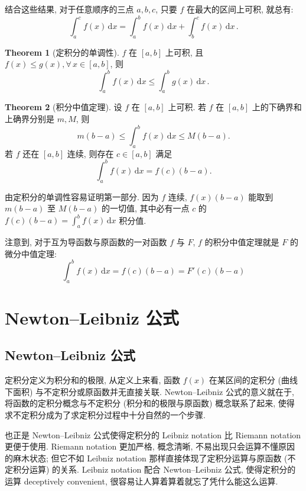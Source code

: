 \documentclass{book}
\newcommand{\Any}{\forall\,}
\newcommand{\dd}{\,\mathrm{d}}
\renewcommand{\le}{\leqslant}
\numberwithin{equation}{section}
\numberwithin{figure}{section}
\theoremstyle{definition}
\newtheorem{theorem}{Theorem}[section]
\begin{document}
结合这些结果, 对于任意顺序的三点 $a,b,c$, 只要 $f$ 在最大的区间上可积, 就总有:
\begin{equation*}
  \int_{a}^{c} f(x) \dd x=\int_{a}^{b} f(x) \dd x+\int_{b}^{c} f(x) \dd x\,.
\end{equation*}

\begin{theorem}[定积分的单调性]
  $f$ 在 $[a,b]$ 上可积, 且 $f(x)\le g(x),\Any x\in[a,b]$, 则
  \begin{equation*}
    \int_{a}^{b} f(x) \dd x\le\int_{a}^{b} g(x) \dd x\,.
  \end{equation*}
\end{theorem}

\begin{theorem}[积分中值定理]
  设 $f$ 在 $[a,b]$ 上可积. 若 $f$ 在 $[a,b]$ 上的下确界和上确界分别是 $m,M$, 则
  \begin{equation*}
    m(b-a)\le\int_{a}^{b} f(x) \dd x\le M(b-a).
  \end{equation*}
  若 $f$ 还在 $[a,b]$ 连续, 则存在 $c\in[a,b]$ 满足
  \begin{equation*}
    \int_{a}^{b} f(x) \dd x=f(c)(b-a).
  \end{equation*}
\end{theorem}
由定积分的单调性容易证明第一部分. 因为 $f$ 连续, $f(x)(b-a)$ 能取到 $m(b-a)$ 至 $M(b-a)$ 的一切值, 其中必有一点 $c$ 的 $f(c)(b-a)=\int_{a}^{b} f(x) \dd x$ 积分值.

注意到, 对于互为导函数与原函数的一对函数 $f$ 与 $F$, $f$ 的积分中值定理就是 $F$ 的微分中值定理:
\begin{equation*}
  \int_{a}^{b} f(x) \dd x=f(c)(b-a)=F'(c)(b-a)
\end{equation*}
\section{Newton--Leibniz 公式}
\subsection{Newton--Leibniz 公式}
定积分定义为积分和的极限, 从定义上来看, 函数 $f(x)$ 在某区间的定积分 (曲线下面积) 与不定积分或原函数并无直接关联. Newton--Leibniz 公式的意义就在于, 将函数的定积分概念与不定积分 (积分和的极限与原函数) 概念联系了起来, 使得求不定积分成为了求定积分过程中十分自然的一个步骤.

也正是 Newton--Leibniz 公式使得定积分的 Leibniz notation 比 Riemann notation 更便于使用. Riemann notation 更加严格, 概念清晰, 不易出现只会运算不懂原因的麻木状态; 但它不如 Leibniz notation 那样直接体现了定积分运算与原函数 (不定积分运算) 的关系. Leibniz notation 配合 Newton--Leibniz 公式, 使得定积分的运算 deceptively convenient, 很容易让人算着算着就忘了凭什么能这么运算. 
\end{document}
